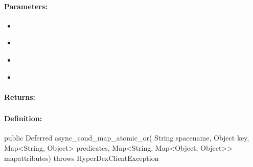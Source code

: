 \paragraph{Parameters:}
\begin{itemize}[noitemsep]
\item {}\\

\item {}\\

\item {}\\

\item {}\\

\end{itemize}

\paragraph{Returns:}


\pagebreak
\subsubsection{}
\label{api:java:async_cond_map_atomic_or}


\paragraph{Definition:}
\begin{javacode}
public Deferred async_cond_map_atomic_or(
        String spacename,
        Object key,
        Map<String, Object> predicates,
        Map<String, Map<Object, Object>> mapattributes) throws HyperDexClientException
\end{javacode}

